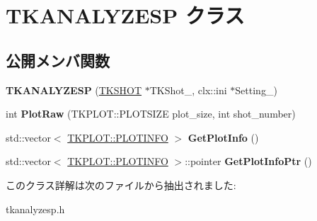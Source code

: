\hypertarget{class_t_k_a_n_a_l_y_z_e_s_p}{}\section{T\+K\+A\+N\+A\+L\+Y\+Z\+E\+SP クラス}
\label{class_t_k_a_n_a_l_y_z_e_s_p}
\subsection*{公開メンバ関数}
\begin{DoxyCompactItemize}
\item 
\mbox{\label{class_t_k_a_n_a_l_y_z_e_s_p_aa2f68f6edb8adf34b6076f6826d56da8}} 
{\bfseries T\+K\+A\+N\+A\+L\+Y\+Z\+E\+SP} (\hyperlink{class_t_k_s_h_o_t}{T\+K\+S\+H\+OT} $\ast$T\+K\+Shot\+\_\+, clx\+::ini $\ast$Setting\+\_\+)
\item 
\mbox{\label{class_t_k_a_n_a_l_y_z_e_s_p_a1ba818f18587dca67f006dddcf38c774}} 
int {\bfseries Plot\+Raw} (T\+K\+P\+L\+O\+T\+::\+P\+L\+O\+T\+S\+I\+ZE plot\+\_\+size, int shot\+\_\+number)
\item 
\mbox{\label{class_t_k_a_n_a_l_y_z_e_s_p_a287e554a4aee42c9232fe0d8b37f4fcb}} 
std\+::vector$<$ \hyperlink{struct_t_k_p_l_o_t_1_1_p_l_o_t_i_n_f_o}{T\+K\+P\+L\+O\+T\+::\+P\+L\+O\+T\+I\+N\+FO} $>$ {\bfseries Get\+Plot\+Info} ()
\item 
\mbox{\label{class_t_k_a_n_a_l_y_z_e_s_p_ade64a95057a2325f7d210ee554ff5779}} 
std\+::vector$<$ \hyperlink{struct_t_k_p_l_o_t_1_1_p_l_o_t_i_n_f_o}{T\+K\+P\+L\+O\+T\+::\+P\+L\+O\+T\+I\+N\+FO} $>$\+::pointer {\bfseries Get\+Plot\+Info\+Ptr} ()
\end{DoxyCompactItemize}


このクラス詳解は次のファイルから抽出されました\+:\begin{DoxyCompactItemize}
\item 
tkanalyzesp.\+h\end{DoxyCompactItemize}
